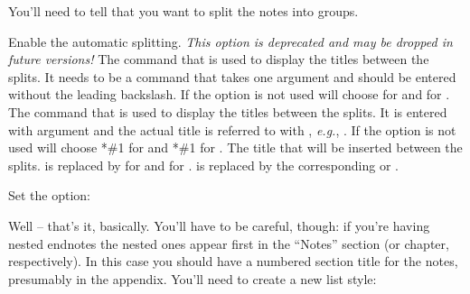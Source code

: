 \documentclass[toc=bib,toc=index]{cnpkgdoc}
\begin{document}
You'll need to tell \enotez that you want to split the notes into groups.
\begin{beschreibung}
    Enable the automatic splitting.
  \Default{}
    \emph{This option is deprecated and may be dropped in future versions!}
    The command that is used to display the titles between the splits.  It
    needs to be a command that takes one argument and should be entered
    without the leading backslash.  If the option is not used \enotez will
    choose  for  and 
    for .
  \newline
    The command that is used to display the titles between
    the splits.  It is entered with argument and the actual title is referred
    to with , \textit{e.g.},
    .  If the option is not used
    \enotez will choose *{\#1} for  and
    *{\#1} for . 
    The title that will be inserted between the splits.   is
    replaced by  for  and 
    for .  is replaced by the corresponding
     or .
\end{beschreibung}
Set the  option:
\begin{beispiel}
\end{beispiel}
Well -- that's it, basically.  You'll have to be careful, though: if you're
having nested endnotes the nested ones appear first in the ``Notes'' section
(or chapter, respectively).  In this case you should have a numbered section
title for the notes, presumably in the appendix.  You'll need to create a new
list style:
\begin{beispiel}
  \usepackage{enotez}
  \appendix
  \printendnotes
\end{beispiel}
\end{document}

